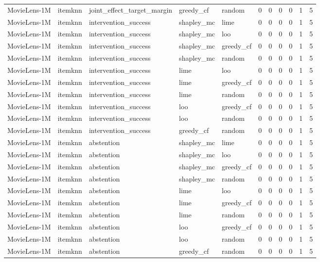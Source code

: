 \begin{table}[t]
{\begin{tabular}{lllllrrrrrr}
MovieLens-1M & itemknn & joint\_effect\_target\_margin & greedy\_cf & random & 0 & 0 & 0 & 0 & 1 & 5 \\
MovieLens-1M & itemknn & intervention\_success & shapley\_mc & lime & 0 & 0 & 0 & 0 & 1 & 5 \\
MovieLens-1M & itemknn & intervention\_success & shapley\_mc & loo & 0 & 0 & 0 & 0 & 1 & 5 \\
MovieLens-1M & itemknn & intervention\_success & shapley\_mc & greedy\_cf & 0 & 0 & 0 & 0 & 1 & 5 \\
MovieLens-1M & itemknn & intervention\_success & shapley\_mc & random & 0 & 0 & 0 & 0 & 1 & 5 \\
MovieLens-1M & itemknn & intervention\_success & lime & loo & 0 & 0 & 0 & 0 & 1 & 5 \\
MovieLens-1M & itemknn & intervention\_success & lime & greedy\_cf & 0 & 0 & 0 & 0 & 1 & 5 \\
MovieLens-1M & itemknn & intervention\_success & lime & random & 0 & 0 & 0 & 0 & 1 & 5 \\
MovieLens-1M & itemknn & intervention\_success & loo & greedy\_cf & 0 & 0 & 0 & 0 & 1 & 5 \\
MovieLens-1M & itemknn & intervention\_success & loo & random & 0 & 0 & 0 & 0 & 1 & 5 \\
MovieLens-1M & itemknn & intervention\_success & greedy\_cf & random & 0 & 0 & 0 & 0 & 1 & 5 \\
MovieLens-1M & itemknn & abstention & shapley\_mc & lime & 0 & 0 & 0 & 0 & 1 & 5 \\
MovieLens-1M & itemknn & abstention & shapley\_mc & loo & 0 & 0 & 0 & 0 & 1 & 5 \\
MovieLens-1M & itemknn & abstention & shapley\_mc & greedy\_cf & 0 & 0 & 0 & 0 & 1 & 5 \\
MovieLens-1M & itemknn & abstention & shapley\_mc & random & 0 & 0 & 0 & 0 & 1 & 5 \\
MovieLens-1M & itemknn & abstention & lime & loo & 0 & 0 & 0 & 0 & 1 & 5 \\
MovieLens-1M & itemknn & abstention & lime & greedy\_cf & 0 & 0 & 0 & 0 & 1 & 5 \\
MovieLens-1M & itemknn & abstention & lime & random & 0 & 0 & 0 & 0 & 1 & 5 \\
MovieLens-1M & itemknn & abstention & loo & greedy\_cf & 0 & 0 & 0 & 0 & 1 & 5 \\
MovieLens-1M & itemknn & abstention & loo & random & 0 & 0 & 0 & 0 & 1 & 5 \\
MovieLens-1M & itemknn & abstention & greedy\_cf & random & 0 & 0 & 0 & 0 & 1 & 5 \\

\end{tabular}}
\end{table}
